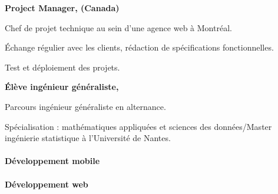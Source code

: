 \documentclass{cv}
\begin{document}
\begin{expbox}[title={mai 2018, \faicon{clock-o} 4 mois}]

	\begin{minipage}[c]{20mm}
	\end{minipage}
	\begin{minipage}[c]{0.8\textwidth}

	\textbf{Project Manager, \adfab{} (Canada)} 

	Chef de projet technique au sein d'une agence web à Montréal.

	Échange régulier avec les clients, rédaction de spécifications fonctionnelles.

	Test et déploiement des projets.
	\end{minipage}

\end{expbox}

\begin{expbox}[title={2016 -- 2019}]

	\begin{minipage}[c]{20mm}
	\end{minipage}
	\begin{minipage}[c]{0.8\textwidth}

	\textbf{Élève ingénieur généraliste, \ecn{}} 

	Parcours ingénieur généraliste en alternance.

	Spécialisation : mathématiques appliquées et sciences des données/Master ingénierie statistique à l'Université de Nantes.
	\end{minipage}

\end{expbox}




\paragraph{Développement mobile} 
   

\paragraph{Développement web}
      
\end{document}
